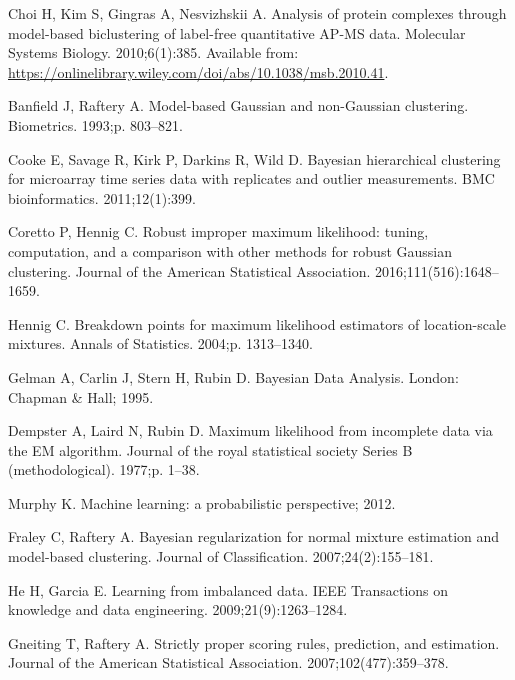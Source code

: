 \documentclass[10pt,letterpaper]{article}\usepackage[]{graphicx}\usepackage[]{color}
\begin{document}
\begin{thebibliography}{10}
Choi H, Kim S, Gingras A, Nesvizhskii A.
\newblock Analysis of protein complexes through model-based biclustering of
  label-free quantitative AP-MS data.
\newblock Molecular Systems Biology. 2010;6(1):385.
\newblock Available from:
  \url{https://onlinelibrary.wiley.com/doi/abs/10.1038/msb.2010.41}.

Banfield J, Raftery A.
\newblock Model-based Gaussian and non-Gaussian clustering.
\newblock Biometrics. 1993;p. 803--821.

Cooke E, Savage R, Kirk P, Darkins R, Wild D.
\newblock Bayesian hierarchical clustering for microarray time series data with
  replicates and outlier measurements.
\newblock BMC bioinformatics. 2011;12(1):399.

Coretto P, Hennig C.
\newblock Robust improper maximum likelihood: tuning, computation, and a
  comparison with other methods for robust Gaussian clustering.
\newblock Journal of the American Statistical Association.
  2016;111(516):1648--1659.

Hennig C.
\newblock Breakdown points for maximum likelihood estimators of location-scale
  mixtures.
\newblock Annals of Statistics. 2004;p. 1313--1340.

Gelman A, Carlin J, Stern H, Rubin D.
\newblock Bayesian Data Analysis.
\newblock London: Chapman \& Hall; 1995.

Dempster A, Laird N, Rubin D.
\newblock Maximum likelihood from incomplete data via the EM algorithm.
\newblock Journal of the royal statistical society Series B (methodological).
  1977;p. 1--38.

Murphy K.
\newblock Machine learning: a probabilistic perspective; 2012.

Fraley C, Raftery A.
\newblock Bayesian regularization for normal mixture estimation and model-based
  clustering.
\newblock Journal of Classification. 2007;24(2):155--181.

He H, Garcia E.
\newblock Learning from imbalanced data.
\newblock IEEE Transactions on knowledge and data engineering.
  2009;21(9):1263--1284.

Gneiting T, Raftery A.
\newblock Strictly proper scoring rules, prediction, and estimation.
\newblock Journal of the American Statistical Association.
  2007;102(477):359--378.


\end{thebibliography}
\end{document}
